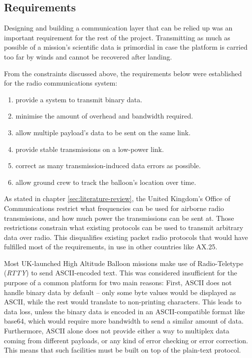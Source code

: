 \subsection{Requirements}

Designing and building a communication layer that can be relied up was an
important requirement for the rest of the project. Transmitting as much as
possible of a mission's scientific data is primordial in case the platform
is carried too far by winds and cannot be recovered after landing.

From the constraints discussed above, the requirements below were established
for the radio communications system:

\begin{enumerate}
    \item provide a system to transmit binary data.
    \item minimise the amount of overhead and bandwidth required.
    \item allow multiple payload's data to be sent on the same link.
    \item provide stable transmissions on a low-power link.
    \item correct as many transmission-induced data errors as possible.
    \item allow ground crew to track the balloon's location over time.
\end{enumerate}


As stated in chapter \ref{sec:literature-review}, the United Kingdom's Office
of Communications restrict what frequencies can be used for airborne
radio transmissions, and how much power the transmissions can be sent at.
Those restrictions constrain what existing protocols can be used to transmit
arbitrary data over radio. This disqualifies existing packet radio protocols
that would have fulfilled most of the requirements, in use in other countries
like AX.25.

Most UK-launched High Altitude Balloon missions make use of Radio-Teletype
(\textit{RTTY}) to send ASCII-encoded text. This was considered insufficient
for the purpose of a common platform for two main reasons: First, ASCII does
not handle binary data by default -- only some byte values would be displayed
as ASCII, while the rest would translate to non-printing characters. This leads
to data loss, unless the binary data is encoded in an ASCII-compatible format
like base64, which would require more bandwidth to send a similar amount of
data. Furthermore, ASCII alone does not provide either a way to multiplex data
coming from different payloads, or any kind of error checking or error
correction. This means that such facilities must be built on top of the
plain-text protocol.


